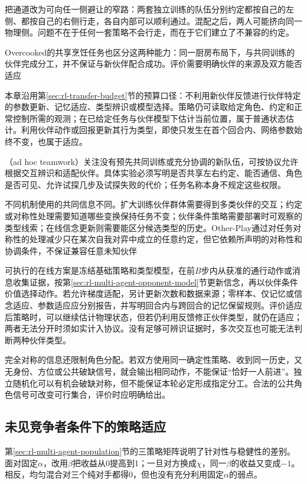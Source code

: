 把通道改为可向任一侧避让的窄路：两套独立训练的队伍分别约定都按自己的左侧、都按自己的右侧行走，各自内部可以顺利通过。混配之后，两人可能挤向同一物理侧。问题不在于任何一套策略不会行走，而在于它们建立了不兼容的约定。

Overcooked的共享烹饪任务也区分这两种能力：同一厨房布局下，与共同训练的伙伴完成分工，并不保证与新伙伴配合成功。评价需要明确伙伴的来源及双方能否适应

本章沿用第\ref{sec:rl-transfer-budget}节的预算口径：不利用新伙伴反馈进行伙伴特定的参数更新、记忆适应、类型辨识或模型选择。策略仍可读取给定角色、约定和正常控制所需的观测；在已给定任务与伙伴模型下估计当前位置，属于普通状态估计。利用伙伴动作或回报更新其行为类型，即使只发生在首个回合内、网络参数始终不变，也属于适应。

（ad hoc teamwork）关注没有预先共同训练或充分协调的新队伍，可按协议允许根据交互辨识和适配伙伴。具体实验必须写明是否共享左右约定、能否通信、角色是否可见、允许试探几步及试探失败的代价；任务名称本身不规定这些权限。

不同机制使用的共同信息不同。扩大训练伙伴群体需要得到多类伙伴的交互；约定或对称性处理需要知道哪些变换保持任务不变；伙伴条件策略需要部署时可观察的类型线索；在线信念更新则需要能区分候选类型的历史。Other-Play通过对任务对称性的处理减少只在某次自我对弈中成立的任意约定，但它依赖所声明的对称性和协调条件，不保证兼容任意未知伙伴

可执行的在线方案是冻结基础策略和类型模型，在前$B$步内从获准的通行动作或消息收集证据，按第\ref{sec:rl-multi-agent-opponent-model}节更新信念，再以伙伴条件价值选择动作。若允许梯度适配，另计更新次数和数据来源；零样本、仅记忆或信念适应、参数适应应分别报告，并写明回合内与跨回合的记忆保留规则。评价适应后策略时，可以继续估计物理状态，但若仍利用反馈修正伙伴类型，就仍在适应；两者无法分开时须如实计入协议。没有足够可辨识证据时，多次交互也可能无法判断两种伙伴类型。

完全对称的信息还限制角色分配。若双方使用同一确定性策略、收到同一历史，又无身份、方位或公共破缺信号，就会输出相同动作，不能保证“恰好一人前进”。独立随机化可以有机会破缺对称，但不能保证本轮必定形成指定分工。合法的公共角色信号可改变可行集合，评价时应明确给出。

\subsection{未见竞争者条件下的策略适应}
\label{sec:rl-multi-agent-new-opponents}

第\ref{sec:rl-multi-agent-population}节的三策略矩阵说明了针对性与稳健性的差别。面对固定$\alpha$，改用$\beta$把收益从0提高到1；一旦对方换成$\chi$，同一$\beta$的收益又变成$-1$。相反，均匀混合对三个纯对手都得0，但也没有充分利用固定$\alpha$的弱点。

